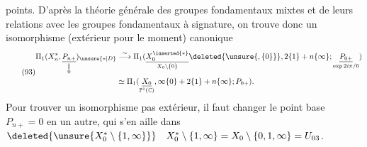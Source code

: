 points. D'après la théorie générale des groupes fondamentaux mixtes et de leurs relations avec les groupes fondamentaux à signature, on trouve donc un isomorphisme (extérieur pour le moment) canonique
\[
\tag{93}
\begin{aligned}
\Pi_1(X_n^*,\underset{\substack{\Vert\\0}}{\underline{P_{n+}}})_{\unsure{*|D}}
&\overset\sim\longrightarrow
\Pi_1(\underset{X_0\setminus\{0\}}{\underline{X_0^{\inserted{*}}}}\deleted{\unsure{,\{0\}}},2\{1\}+n\{\infty\};\underset{\exp 2i\pi/6}{\underline{P_{0+}}})\\
&\simeq\Pi_1(\underset{\mathbb P^1(\mathbb C)}{\underline{X_0}},\infty\{0\}+2\{1\}+n\{\infty\};P_{0+}).
\end{aligned}
\]
Pour trouver un isomorphisme pas extérieur, il faut changer le point base $P_{n+}=0$ en un autre, qui s'en aille dans
$\deleted{\unsure{X_0^*\setminus\{1,\infty\}}}\quad X_0^*\setminus\{1,\infty\}=X_0\setminus\{0,1,\infty\}=U_{03}$.

